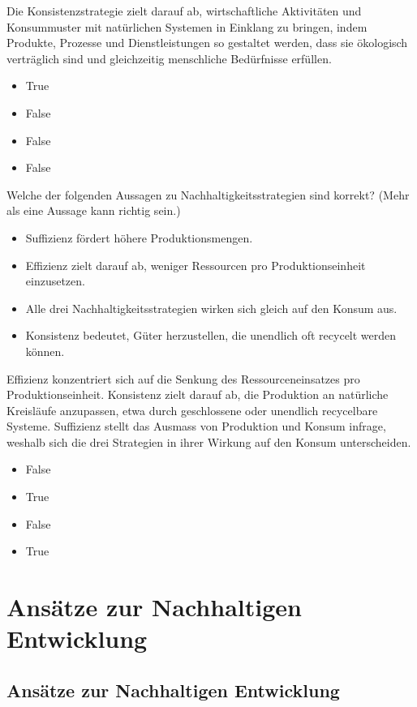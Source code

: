 \documentclass[
  nswissgerman,
  a4paper,
  openany]{book}
\providecommand{\tightlist}{%
  \setlength{\itemsep}{0pt}\setlength{\parskip}{0pt}}
\begin{document}
Die Konsistenzstrategie zielt darauf ab, wirtschaftliche Aktivitäten und
Konsummuster mit natürlichen Systemen in Einklang zu bringen, indem
Produkte, Prozesse und Dienstleistungen so gestaltet werden, dass sie
ökologisch verträglich sind und gleichzeitig menschliche Bedürfnisse
erfüllen.

\begin{itemize}
\tightlist
\item
  True
\item
  False
\item
  False
\item
  False
\end{itemize}

Welche der folgenden Aussagen zu Nachhaltigkeitsstrategien sind korrekt?
(Mehr als eine Aussage kann richtig sein.)

\begin{itemize}
\tightlist
\item[$\square$]
  Suffizienz fördert höhere Produktionsmengen.
\item[$\square$]
  Effizienz zielt darauf ab, weniger Ressourcen pro Produktionseinheit
  einzusetzen.
\item[$\square$]
  Alle drei Nachhaltigkeitsstrategien wirken sich gleich auf den Konsum
  aus.
\item[$\square$]
  Konsistenz bedeutet, Güter herzustellen, die unendlich oft recycelt
  werden können.
\end{itemize}

Effizienz konzentriert sich auf die Senkung des Ressourceneinsatzes pro
Produktionseinheit. Konsistenz zielt darauf ab, die Produktion an
natürliche Kreisläufe anzupassen, etwa durch geschlossene oder unendlich
recycelbare Systeme. Suffizienz stellt das Ausmass von Produktion und
Konsum infrage, weshalb sich die drei Strategien in ihrer Wirkung auf
den Konsum unterscheiden.

\begin{itemize}
\tightlist
\item
  False
\item
  True
\item
  False
\item
  True
\end{itemize}

\part{Ansätze zur Nachhaltigen Entwicklung}

\chapter{Ansätze zur Nachhaltigen
Entwicklung}\label{ansuxe4tze-zur-nachhaltigen-entwicklung-1}
\end{document}
